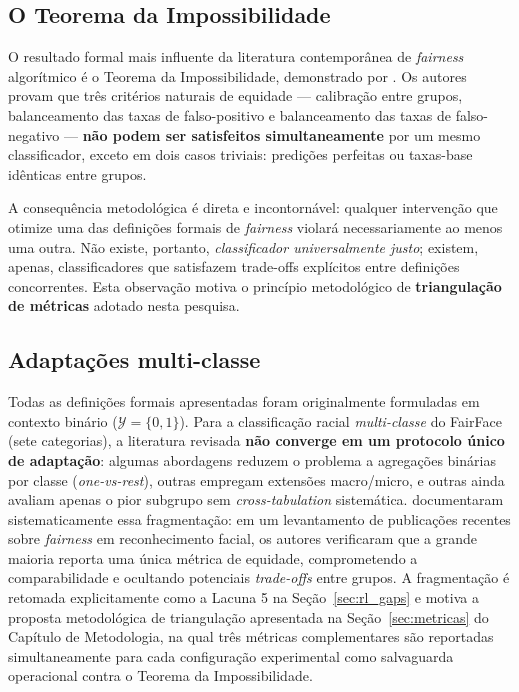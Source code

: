 \subsection{O Teorema da Impossibilidade}
\label{sec:rl_metricas_impossibilidade}

O resultado formal mais influente da literatura contemporânea de \emph{fairness} algorítmico é o Teorema da Impossibilidade, demonstrado por . Os autores provam que três critérios naturais de equidade --- calibração entre grupos, balanceamento das taxas de falso-positivo e balanceamento das taxas de falso-negativo --- \textbf{não podem ser satisfeitos simultaneamente} por um mesmo classificador, exceto em dois casos triviais: predições perfeitas ou taxas-base idênticas entre grupos.

A consequência metodológica é direta e incontornável: qualquer intervenção que otimize uma das definições formais de \emph{fairness} violará necessariamente ao menos uma outra. Não existe, portanto, \emph{classificador universalmente justo}; existem, apenas, classificadores que satisfazem trade-offs explícitos entre definições concorrentes. Esta observação motiva o princípio metodológico de \textbf{triangulação de métricas} adotado nesta pesquisa.

\subsection{Adaptações multi-classe}
\label{sec:rl_metricas_multiclasse}

Todas as definições formais apresentadas foram originalmente formuladas em contexto binário ($\mathcal{Y} = \{0, 1\}$). Para a classificação racial \emph{multi-classe} do FairFace (sete categorias), a literatura revisada \textbf{não converge em um protocolo único de adaptação}: algumas abordagens reduzem o problema a agregações binárias por classe (\emph{one-vs-rest}), outras empregam extensões macro/micro, e outras ainda avaliam apenas o pior subgrupo sem \emph{cross-tabulation} sistemática.  documentaram sistematicamente essa fragmentação: em um levantamento de publicações recentes sobre \emph{fairness} em reconhecimento facial, os autores verificaram que a grande maioria reporta uma única métrica de equidade, comprometendo a comparabilidade e ocultando potenciais \emph{trade-offs} entre grupos. A fragmentação é retomada explicitamente como a Lacuna 5 na Seção~\ref{sec:rl_gaps} e motiva a proposta metodológica de triangulação apresentada na Seção~\ref{sec:metricas} do Capítulo de Metodologia, na qual três métricas complementares são reportadas simultaneamente para cada configuração experimental como salvaguarda operacional contra o Teorema da Impossibilidade.

